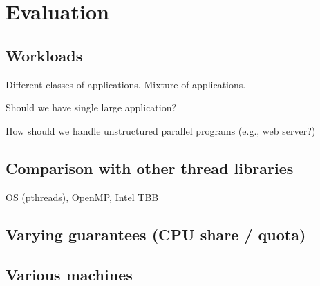 \section{Evaluation}
\subsection{Workloads}
Different classes of applications. Mixture of applications.

Should we have single large application?

How should we handle unstructured parallel programs (e.g., web server?)

\subsection{Comparison with other thread libraries}
OS (pthreads), OpenMP, Intel TBB
\subsection{Varying guarantees (CPU share / quota)}

\subsection{Various machines}
